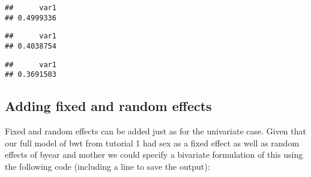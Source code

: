 \documentclass[
  12pt,
]{book}
\newenvironment{Shaded}{\begin{snugshade}}{\end{snugshade}}
\newcommand{\FloatTok}[1]{\textcolor[rgb]{0.00,0.00,0.81}{#1}}
\newcommand{\FunctionTok}[1]{\textcolor[rgb]{0.00,0.00,0.00}{#1}}
\newcommand{\NormalTok}[1]{#1}
\newcommand{\OtherTok}[1]{\textcolor[rgb]{0.56,0.35,0.01}{#1}}
\newcommand{\SpecialCharTok}[1]{\textcolor[rgb]{0.00,0.00,0.00}{#1}}
\newcommand{\StringTok}[1]{\textcolor[rgb]{0.31,0.60,0.02}{#1}}
\begin{document}
\begin{verbatim}
##      var1 
## 0.4999336
\end{verbatim}

\begin{Shaded}
\end{Shaded}

\begin{verbatim}
##      var1 
## 0.4038754
\end{verbatim}

\begin{Shaded}
\end{Shaded}

\begin{verbatim}
##      var1 
## 0.3691503
\end{verbatim}

\hypertarget{adding-fixed-and-random-effects-1}{%
\subsection{Adding fixed and random effects}\label{adding-fixed-and-random-effects-1}}

Fixed and random effects can be added just as for the univariate case.
Given that our full model of bwt from tutorial 1 had sex as a fixed effect as well as random effects of byear and mother we could specify a bivariate formulation of this using the following code (including a line to save the output):
\end{document}
